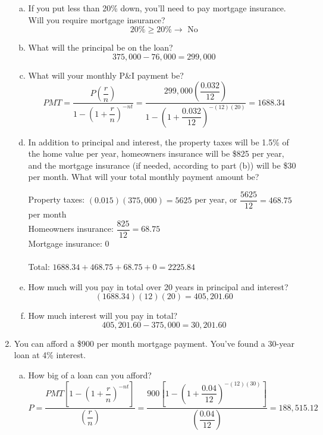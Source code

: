 \begin{enumerate}
\begin{enumerate}[(a)]
\item If you put less than 20\% down, you'll need to pay mortgage insurance.  Will you require mortgage insurance? 
\[20\% \geq 20\% \longrightarrow \textrm{ No}\]

\item What will the principal be on the loan? 
\[375,000 - 76,000 = 299,000\]

\item What will your monthly P\&I payment be? 
\[PMT = \dfrac{P\left(\dfrac{r}{n}\right)}{1-\left(1+\dfrac{r}{n}\right)^{-nt}} = \dfrac{299,000\left(\dfrac{0.032}{12}\right)}{1-\left(1+\dfrac{0.032}{12}\right)^{-(12)(20)}} = 1688.34\]

\item In addition to principal and interest, the property taxes will be 1.5\% of the home value per year, homeowners insurance will be \$825 per year, and the mortgage insurance (if needed, according to part (b)) will be \$30 per month.  What will your total monthly payment amount be? 
\begin{center}
Property taxes: $(0.015)(375,000) = 5625$ per year, or $\dfrac{5625}{12} = 468.75$ per month\\
Homeowners insurance: $\dfrac{825}{12} = 68.75$\\
Mortgage insurance: $0$\\ \text{}\\
Total: $1688.34 + 468.75 + 68.75 + 0 = 2225.84$
\end{center}

\item How much will you pay in total over 20 years in principal and interest? 
\[(1688.34)(12)(20) = 405,201.60\]

\item How much interest will you pay in total? 
\[405,201.60 - 375,000 = 30,201.60\]
\end{enumerate}

\item You can afford a \$900 per month mortgage payment.  You've found a 30-year loan at 4\% interest.
\begin{enumerate}[(a)]
\item How big of a loan can you afford? 
\[P = \dfrac{PMT\left[1-\left(1+\dfrac{r}{n}\right)^{-nt}\right]}{\left(\dfrac{r}{n}\right)} = \dfrac{900\left[1-\left(1+\dfrac{0.04}{12}\right)^{-(12)(30)}\right]}{\left(\dfrac{0.04}{12}\right)} = 188,515.12\]


\end{enumerate}
\end{enumerate}

